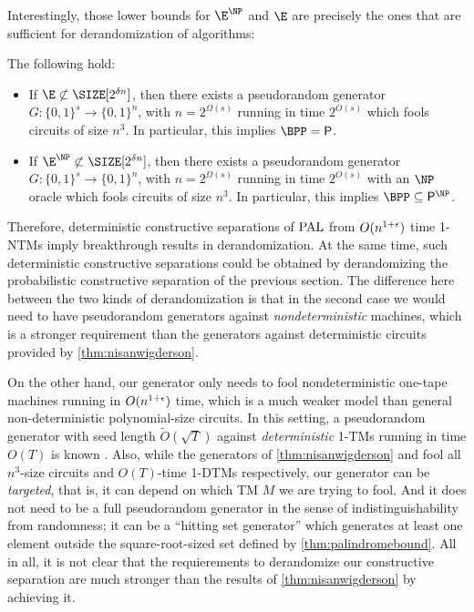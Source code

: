 Interestingly, those lower bounds for $\E^{\NP}$ and $\E$ are precisely the ones that are sufficient
for derandomization of
algorithms:

\begin{theorem}[\cite{NW94, IW97}] 
    \label{thm:nisanwigderson}
    The following hold:
    \begin{itemize}
    \item If $\E \not\subset \SIZE[2^{\delta n}]$, then there exists a pseudorandom generator $G : \{0, 1\}^s \to \{0, 1\}^n$,
    with $n = 2^{\Omega(s)}$ running in time $2^{O(s)}$ which fools circuits of size $n^3$.
    In particular, this implies $\BPP = \PTIME$. 
    \item If $\E^{\NP} \not\subset \SIZE[2^{\delta n}]$, then there exists a pseudorandom generator $G : \{0, 1\}^s \to \{0, 1\}^n$,
    with $n = 2^{\Omega(s)}$ running in time $2^{O(s)}$ with an $\NP$ oracle which fools circuits of size $n^3$.
    In particular, this implies $\BPP \subseteq \PTIME^\NP$. 
    \end{itemize}
\end{theorem}

Therefore, deterministic constructive separations of $\mathrm{PAL}$ from $O(n^{1+\epsilon})$ time 1-NTMs imply breakthrough results in
derandomization. At the same time, such deterministic constructive separations could be obtained by derandomizing the
probabilistic constructive separation of the previous section. The difference here between the two kinds of derandomization
is that in the second case we would need to have pseudorandom generators against \emph{nondeterministic} machines, which 
is a stronger requirement than the generators against deterministic circuits provided by \cref{thm:nisanwigderson}.

On the other hand, our generator only needs to fool nondeterministic one-tape machines running in $O(n^{1+\epsilon})$ time, 
which is a much weaker model than general non-deterministic polynomial-size circuits. In this setting, a pseudorandom
generator with seed length $\tilde{O}(\sqrt{T})$ against \emph{deterministic} 1-TMs running in time $O(T)$ is known 
\cite{Impagliazzo94}. Also, while the generators of \cref{thm:nisanwigderson} and \cite{Impagliazzo94} fool all 
$n^3$-size circuits and $O(T)$-time 1-DTMs respectively, our generator can be \emph{targeted}, that is, it can depend
on which TM $M$ we are trying to fool. And it does not need to be a full pseudorandom generator in the sense of 
indistinguishability from randomness; it can be a ``hitting set generator'' \cite{Andreev98} which generates at least
one element outside the square-root-sized set defined by \cref{thm:palindromebound}. All in all, it is not clear
that the requierements to derandomize our constructive separation are much stronger than the results of 
\cref{thm:nisanwigderson} by achieving it. 

